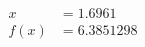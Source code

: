 \documentclass[preview]{standalone}
\begin{document}
\begin{align*}
x &= 1.6961\\f(x) &= 6.3851298
\end{align*}
\end{document}
